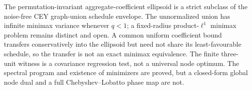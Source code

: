 The permutation-invariant aggregate-coefficient ellipsoid is a strict subclass of the noise-free CEY graph-union schedule envelope.  The unnormalized union has infinite minimax variance whenever \(q<1\); a fixed-radius product-\(\ell^1\) minimax problem remains distinct and open.  A common uniform coefficient bound transfers conservatively into the ellipsoid but need not share its least-favourable schedule, so the transfer is not an exact minimax equivalence.  The finite three-unit witness is a covariance regression test, not a universal node optimum.  The spectral program and existence of minimizers are proved, but a closed-form global node dual and a full Chebyshev--Lobatto phase map are not.